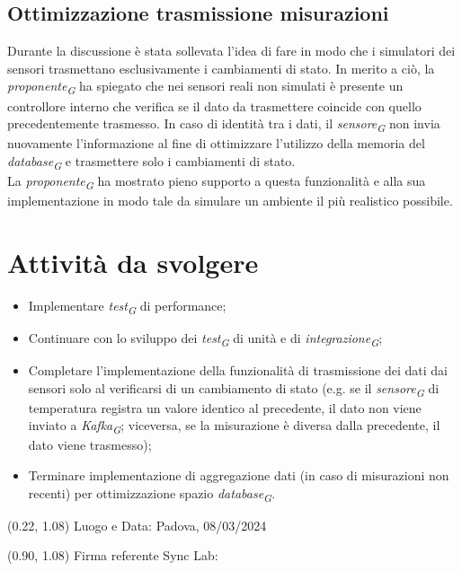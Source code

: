 \documentclass{article}
\begin{document}
    \subsection{Ottimizzazione trasmissione misurazioni}
        Durante la discussione è stata sollevata l'idea di fare in modo che i simulatori dei sensori trasmettano esclusivamente i cambiamenti di stato. In merito a ciò, la \textit{proponente}\textsubscript{\textit{G}} ha spiegato che nei sensori reali non simulati è presente un controllore interno che verifica se il dato da trasmettere coincide con quello precedentemente trasmesso. In caso di identità tra i dati, il \textit{sensore}\textsubscript{\textit{G}} non invia nuovamente l'informazione al fine di ottimizzare l'utilizzo della memoria del \textit{database}\textsubscript{\textit{G}} e trasmettere solo i cambiamenti di stato. \\
        La \textit{proponente}\textsubscript{\textit{G}} ha mostrato pieno supporto a questa funzionalità e alla sua implementazione in modo tale da simulare un ambiente il più realistico possibile.

\section{Attività da svolgere}
    \begin{itemize}
        \item Implementare \textit{test}\textsubscript{\textit{G}} di performance;
        \item Continuare con lo sviluppo dei \textit{test}\textsubscript{\textit{G}} di unità e di \textit{integrazione}\textsubscript{\textit{G}};
        \item Completare l'implementazione della funzionalità di trasmissione dei dati dai sensori solo al verificarsi di un cambiamento di stato (e.g. se il \textit{sensore}\textsubscript{\textit{G}} di temperatura registra un valore identico al precedente, il dato non viene inviato a \textit{Kafka}\textsubscript{\textit{G}}; viceversa, se la misurazione è diversa dalla precedente, il dato viene trasmesso);
        \item Terminare implementazione di aggregazione dati (in caso di misurazioni non recenti) per ottimizzazione spazio \textit{database}\textsubscript{\textit{G}}.
\end{itemize}
\begin{textblock*}{\textwidth}(0.22\textwidth, 1.08\textheight)
    Luogo e Data: Padova, 08/03/2024
\end{textblock*}

\begin{textblock*}{\textwidth}(0.90\textwidth, 1.08\textheight)
        Firma referente Sync Lab:
\end{textblock*}
\end{document}
